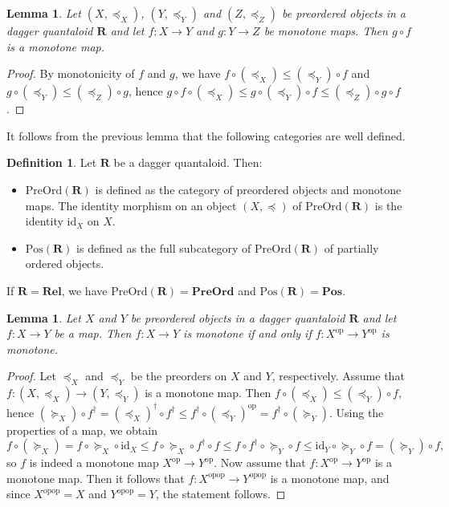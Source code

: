 \documentclass[12pt]{tac}
\newtheorem{lemma}[theorem]{Lemma}
\theoremstyle{definition}
\newtheorem{definition}[theorem]{Definition}
\theoremstyle{remark}
\newcommand{\qo}{{\boldsymbol{\preccurlyeq}}}
\newcommand{\qop}{{\boldsymbol{\succcurlyeq}}}
\newcommand{\<}{\langle}
\renewcommand{\>}{\rangle}
\renewcommand{\:}{\colon}
\newcommand{\op}{\mathrm{op}}
\newcommand{\id}{\mathrm{id}}
\begin{document}
\begin{lemma}
    Let $(X,\qo_X)$, $(Y,\qo_Y)$ and $(Z,\qo_Z)$ be preordered objects in a dagger quantaloid $\mathbf R$ and let $f:X\to Y$ and $g:Y\to Z$ be monotone maps. Then $g\circ f$ is a monotone map. 
\end{lemma}
\begin{proof}By monotonicity of $f$ and $g$, we have $f\circ(\qo_X)\leq (\qo_Y)\circ f$ and $g\circ (\qo_Y)\leq (\qo_Z)\circ g$, hence $g\circ f\circ (\qo_X)\leq g\circ(\qo_Y)\circ f\leq (\qo_Z)\circ g\circ f$. 
\end{proof}

It follows from the previous lemma that the following categories are well defined.
\begin{definition}Let $\mathbf R$ be a dagger quantaloid. Then:
\begin{itemize}
    \item  $\mathrm{PreOrd}(\mathbf R)$ is defined as the category of preordered objects and monotone maps. The identity morphism on an object $(X,\qo)$ of $\mathrm{PreOrd}(\mathbf R)$ is the identity $\id_X$ on $X$.
    \item $\mathrm{Pos}(\mathbf R)$ is defined as the full subcategory of $\mathrm{PreOrd}(\mathbf R)$ of partially ordered objects.
    \end{itemize}
If $\mathbf R=\mathbf{Rel}$, we have $\mathrm{PreOrd}(\mathbf R)=\mathbf{PreOrd}$ and $\mathrm{Pos}(\mathbf R)=\mathbf{Pos}$.
\end{definition}

\begin{lemma}\label{lem:functions and the opposite order}
Let $X$ and $Y$ be preordered objects in a dagger quantaloid $\mathbf R$ and let $f:X\to Y$ be a map. Then $f:X\to Y$ is monotone if and only if $f:X^\op\to Y^\op$ is monotone.
\end{lemma}

\begin{proof}
Let $\qo_X$ and $\qo_Y$ be the preorders on $X$ and $Y$, respectively. Assume that $f:(X,\qo_X)\to(Y,\qo_Y)$ is a monotone map. Then $f\circ (\qo_X)\leq (\qo_Y)\circ f$, hence $(\qop_X)\circ f^\dag=(\qo_X)^\dag\circ f^\dag\leq f^\dag\circ (\qo_Y)^\op=f^\dag\circ(\qop_Y)$. Using the properties of a map, we obtain
\[f\circ (\qop_X)=f\circ \qop_X\circ \id_X\leq  f\circ \qop_X\circ f^\dag\circ f\leq f\circ f^\dag\circ \qop_Y\circ f\leq \id_Y\circ \qop_Y\circ f=(\qop_Y)\circ f,\] 
so $f$ is indeed a monotone map $X^\op\to Y^ \op$. Now assume that $f:X^\op\to Y^\op$ is a monotone map. Then it follows that $f:X^{\op\op}\to Y^{\op\op}$ is a monotone map, and since $X^{\op\op}=X$ and $Y^{\op\op}=Y$, the statement follows.
\end{proof}
\end{document}
